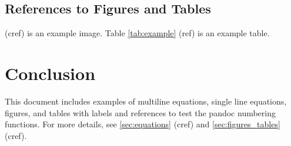 \documentclass{article}
\begin{document}
\subsection{References to Figures and Tables}
 (cref) is an example image. Table \ref{tab:example} (ref) is an example table. 

\section{Conclusion}
This document includes examples of multiline equations, single line equations, figures, and tables with labels and references to test the pandoc numbering functions. For more details, see \cref{sec:equations} (cref) and \cref{sec:figures_tables} (cref).
\end{document}
